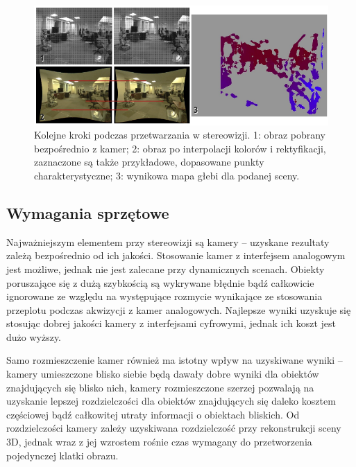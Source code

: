 \begin{figure}[h!]
\centering
\includegraphics{../../Common/img/stereo_steps}
\caption[Kolejne kroki podczas przetwarzania w stereowizji]
{Kolejne kroki podczas przetwarzania w stereowizji. 1: obraz pobrany
bezpośrednio z kamer; 2: obraz po interpolacji kolorów i rektyfikacji,
zaznaczone są także przykładowe, dopasowane punkty charakterystyczne; 3:
wynikowa mapa głebi dla podanej sceny.}
\label{fig:stereo_steps}
\end{figure}

\subsection{Wymagania sprzętowe}

Najważniejszym elementem przy stereowizji są kamery -- uzyskane rezultaty zależą
bezpośrednio od ich jakości. Stosowanie kamer z interfejsem analogowym jest
możliwe, jednak nie jest zalecane przy dynamicznych scenach. Obiekty
poruszające się z dużą szybkością są wykrywane błędnie bądź całkowicie
ignorowane ze względu na występujące rozmycie wynikające ze stosowania
przeplotu podczas akwizycji z kamer analogowych. Najlepsze wyniki uzyskuje się
stosując dobrej jakości kamery z interfejsami cyfrowymi, jednak ich koszt jest
dużo wyższy.

Samo rozmieszczenie kamer również ma istotny wpływ na uzyskiwane wyniki --
kamery umieszczone blisko siebie będą dawały dobre wyniki dla obiektów
znajdujących się blisko nich, kamery rozmieszczone szerzej pozwalają na
uzyskanie lepszej rozdzielczości dla obiektów znajdujących się daleko kosztem
częściowej bądź całkowitej utraty informacji o obiektach bliskich. Od
rozdzielczości kamery zależy uzyskiwana rozdzielczość przy rekonstrukcji sceny
3D, jednak wraz z jej wzrostem rośnie czas wymagany do przetworzenia
pojedynczej klatki obrazu.

